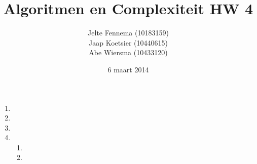 \documentclass[11pt]{article}
\title{\textbf{Algoritmen en Complexiteit HW 4}}
\author{Jelte Fennema (10183159)\\
		Jaap Koetsier (10440615)\\
        Abe Wiersma (10433120)}
\date{6 maart 2014}
\begin{document}
\maketitle

\begin{enumerate}
    \item

    \item

    \item

    \item
        \begin{enumerate}
            \item

			\item 
            
        \end{enumerate}

\end{enumerate}
\end{document}
